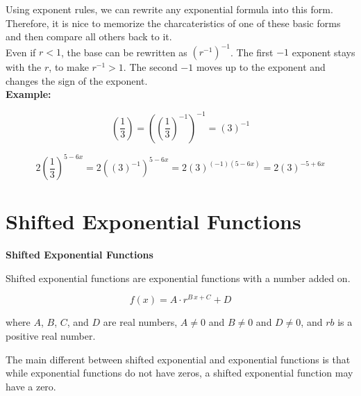 \documentclass{ximera}
\begin{document}
Using exponent rules, we can rewrite any exponential formula into this form.  Therefore, it is nice to memorize the charcateristics of one of these basic forms and then compare all others back to it. \\




Even if $r<1$, the base can be rewritten as $(r^{-1})^{-1}$. The first $-1$ exponent stays with the $r$, to make $r^{-1}>1$.  The second $-1$ moves up to the exponent and changes the sign of the exponent.\\


\textbf{Example:}  

\[
\left( \frac{1}{3} \right) = \left( \left( \frac{1}{3} \right)^{-1} \right)^{-1} = ( 3 )^{-1}
\]

\[
2 \left( \frac{1}{3} \right)^{5-6x} = 2 \left( ( 3 )^{-1} \right)^{5-6x} = 2 (3)^{(-1)(5-6x)} =  2 (3)^{-5+6x}
\]






\section*{Shifted Exponential Functions}


\begin{definition} \textbf{\textcolor{green!50!black}{Shifted Exponential Functions}}

Shifted exponential functions are exponential functions with a number added on.


\[      f(x) = A \cdot r^{B \, x + C} + D   \]

where $A$, $B$, $C$, and $D$ are real numbers, $A \ne 0$ and $B \ne 0$ and $D \ne 0$, and $rb$ is a positive real number.


\end{definition}




The main different between shifted exponential and exponential functions is that while exponential functions do not have zeros, a shifted exponential function may have a zero. \\
\end{document}
